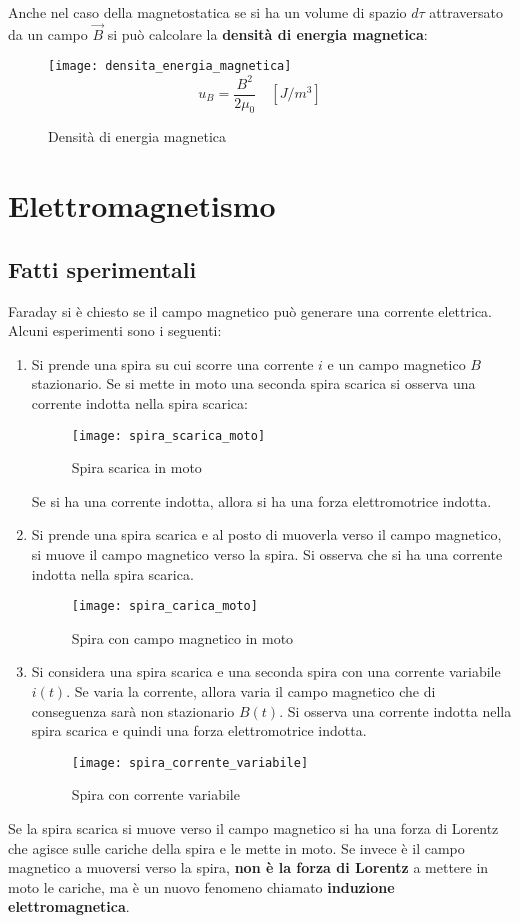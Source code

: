 \documentclass[a4paper]{article}
\begin{document}
\vspace{1em}
\noindent
Anche nel caso della magnetostatica se si ha un volume di spazio \( d \tau \)
attraversato da un campo \( \vec{B} \) si può calcolare la \textbf{densità di energia magnetica}:
\begin{figure}[H]
  \centering
  \texttt{[image: densita\_energia\_magnetica]}
  \[
    u_B = \frac{B^2}{2 \mu_0} \quad \left[ J/m^3 \right]
  \] 
  \caption{Densità di energia magnetica}
\end{figure}

\section{Elettromagnetismo}
\subsection{Fatti sperimentali}
Faraday si è chiesto se il campo magnetico può generare una corrente elettrica. 
Alcuni esperimenti sono i seguenti:
\begin{enumerate}
  \item Si prende una spira su cui scorre una corrente \( i \) e un campo magnetico \( B \)
    stazionario. Se si mette in moto una seconda spira scarica si osserva una corrente
    indotta nella spira scarica:
    \begin{figure}[H]
      \centering
      \texttt{[image: spira\_scarica\_moto]}
      \caption{Spira scarica in moto}
    \end{figure}
    \noindent
    Se si ha una corrente indotta, allora si ha una forza elettromotrice indotta.

  \item Si prende una spira scarica e al posto di muoverla verso il campo magnetico,
    si muove il campo magnetico verso la spira. Si osserva che si ha una corrente indotta
    nella spira scarica.
    \begin{figure}[H]
      \centering
      \texttt{[image: spira\_carica\_moto]}
      \caption{Spira con campo magnetico in moto}
    \end{figure}

  \item Si considera una spira scarica e una seconda spira con una corrente variabile
    \( i(t) \). Se varia la corrente, allora varia il campo magnetico che di conseguenza
    sarà non stazionario \( B(t) \). Si osserva una corrente indotta nella spira
    scarica e quindi una forza elettromotrice indotta.
    \begin{figure}[H]
      \centering
      \texttt{[image: spira\_corrente\_variabile]}
      \caption{Spira con corrente variabile}
    \end{figure}
\end{enumerate}
Se la spira scarica si muove verso il campo magnetico si ha una forza di Lorentz che agisce
sulle cariche della spira e le mette in moto. Se invece è il campo magnetico a muoversi
verso la spira, \textbf{non è la forza di Lorentz} a mettere in moto le cariche, ma è un
nuovo fenomeno chiamato \textbf{induzione elettromagnetica}.
\end{document}
